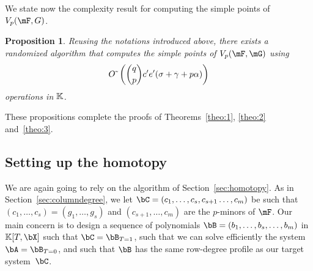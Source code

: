 \documentclass[12pt]{article}
\newtheorem{proposition}[definition]{Proposition}
\begin{document}
We state now the complexity result for computing the simple
points of $\VpFG{p}{\mF}{G}$.

\begin{proposition}\label{prop:rowdegree_simple}
  Reusing the notations introduced above, there
  exists a randomized algorithm that computes the simple
  points of $\VpFG{p}{\mF}{\mG}$ using
  $${O}{\,\tilde{ }\,}\left({q \choose p} {c'}{} {e'}{} (\sigma + \gamma+ p \alpha)
  \right)$$ operations in $\mathbb{K}$.
\end{proposition}
These propositions complete the proofs of Theorems~\ref{theo:1},
\ref{theo:2} and~\ref{theo:3}. 


\subsection{Setting up the homotopy}

We are again going to rely on the algorithm of
Section~\ref{sec:homotopy}. As in Section~\ref{sec:columndegree}, we
let $\bC=(c_1,\dots,c_s,c_{s+1}\dots,c_m)$ be such that
$(c_1,\dots,c_s)=(g_1,\dots,g_s)$ and $(c_{s+1},\dots,c_m)$ are the
$p$-minors of $\mF$. Our main concern is to design a sequence of
polynomials $\bB=(b_1,\dots,b_s,\dots,b_m)$ in $\KK[T,\bX]$ such that
$\bC=\bB_{T=1}$, such that we can solve efficiently the system
$\bA=\bB_{T=0}$, and such that $\bB$ has the same row-degree profile
as our target system~$\bC$.
\end{document}
